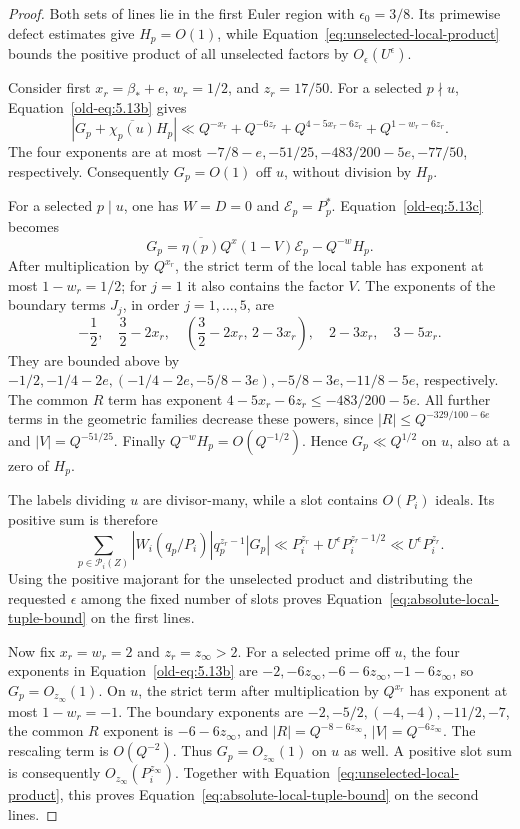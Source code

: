 \documentclass[11pt,a4paper]{article}
\numberwithin{equation}{section}
\numberwithin{figure}{section}
\theoremstyle{definition}
\theoremstyle{remark}
\begin{document}
\begin{proof}
Both sets of lines lie in the first Euler region with $\epsilon_0=3/8$.
Its primewise defect estimates give $H_p=O(1)$, while
Equation~\eqref{eq:unselected-local-product} bounds the positive product
of all unselected factors by $O_\epsilon(U^\epsilon)$.

Consider first $x_r=\beta_*+e$, $w_r=1/2$, and $z_r=17/50$.
For a selected $p\nmid u$, Equation~\eqref{old-eq:5.13b} gives
\[
 |G_p+\overline{\chi_p(u)}H_p|
 \ll Q^{-x_r}+Q^{-6z_r}
       +Q^{4-5x_r-6z_r}+Q^{1-w_r-6z_r}.
\]
The four exponents are at most
$-7/8-e,-51/25,-483/200-5e,-77/50$, respectively.
Consequently $G_p=O(1)$ off $u$, without division by $H_p$.

For a selected $p\mid u$, one has $W=D=0$ and
$\mathcal E_p=P_p^*$.  Equation~\eqref{old-eq:5.13c} becomes
\[
 G_p=\overline{\eta(p)}Q^x(1-V)\mathcal E_p-Q^{-w}H_p.
\]
After multiplication by $Q^{x_r}$, the strict term of the local table
has exponent at most $1-w_r=1/2$; for $j=1$ it also contains the factor
$V$.  The exponents of the boundary terms $J_j$, in order $j=1,\ldots,5$,
are
\[
 -\frac12,\quad \frac32-2x_r,\quad
 \left(\frac32-2x_r,\,2-3x_r\right),\quad
 2-3x_r,\quad 3-5x_r.
\]
They are bounded above by
$-1/2,-1/4-2e,(-1/4-2e,-5/8-3e),-5/8-3e,-11/8-5e$,
respectively.  The common $R$ term has exponent
$4-5x_r-6z_r\le-483/200-5e$.  All further terms in the geometric
families decrease these powers, since
$|R|\le Q^{-329/100-6e}$ and $|V|=Q^{-51/25}$.
Finally $Q^{-w}H_p=O(Q^{-1/2})$.  Hence $G_p\ll Q^{1/2}$ on $u$,
also at a zero of $H_p$.

The labels dividing $u$ are divisor-many, while a slot contains $O(P_i)$
ideals.  Its positive sum is therefore
\begin{equation}\label{eq:small-line-positive-slot}
 \sum_{p\in\mathcal P_i(Z)}
       |W_i(q_p/P_i)|q_p^{z_r-1}|G_p|
 \ll P_i^{z_r}+U^\epsilon P_i^{z_r-1/2}
 \ll U^\epsilon P_i^{z_r}.
\end{equation}
Using the positive majorant for the unselected product and distributing
the requested $\epsilon$ among the fixed number of slots proves
Equation~\eqref{eq:absolute-local-tuple-bound} on the first lines.

Now fix $x_r=w_r=2$ and $z_r=z_\infty>2$.  For a selected prime off
$u$, the four exponents in Equation~\eqref{old-eq:5.13b} are
$-2,-6z_\infty,-6-6z_\infty,-1-6z_\infty$, so
$G_p=O_{z_\infty}(1)$.  On $u$, the strict term after multiplication by
$Q^{x_r}$ has exponent at most $1-w_r=-1$.  The boundary exponents are
$-2,-5/2,(-4,-4),-11/2,-7$, the common $R$ exponent is
$-6-6z_\infty$, and $|R|=Q^{-8-6z_\infty}$, $|V|=Q^{-6z_\infty}$.
The rescaling term is $O(Q^{-2})$.  Thus $G_p=O_{z_\infty}(1)$ on $u$
as well.  A positive slot sum is consequently $O_{z_\infty}(P_i^{z_\infty})$.
Together with Equation~\eqref{eq:unselected-local-product}, this proves
Equation~\eqref{eq:absolute-local-tuple-bound} on the second lines.
\end{proof}
\end{document}

